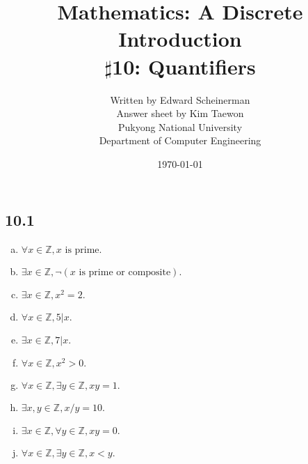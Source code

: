 \documentclass{article}
\title{Mathematics: A Discrete Introduction
\\$\sharp$10: Quantifiers}
\author{Written by Edward Scheinerman\\Answer sheet by Kim Taewon\\Pukyong National University\\Department of Computer Engineering}
\date{\today}
\begin{document}
\maketitle

\subsection*{10.1}

\begin{enumerate}[a.]
    \item $\forall x \in \mathbb{Z}, x \textrm{ is prime}.$
    \item $\exists x \in \mathbb{Z}, \neg(x\textrm{ is prime or composite}).$
    \item $\exists x \in \mathbb{Z}, x^2=2.$
    \item $\forall x \in \mathbb{Z}, 5|x.$
    \item $\exists x \in \mathbb{Z}, 7|x.$
    \item $\forall x \in \mathbb{Z}, x^2 > 0.$
    \item $\forall x \in \mathbb{Z}, \exists y \in \mathbb{Z}, xy = 1.$
    \item $\exists x,y \in \mathbb{Z}, x/y = 10.$
    \item $\exists x \in \mathbb{Z}, \forall y \in \mathbb{Z}, xy = 0.$
    \item $\forall x \in \mathbb{Z}, \exists y \in \mathbb{Z}, x < y.$
\end{enumerate}
\end{document}
